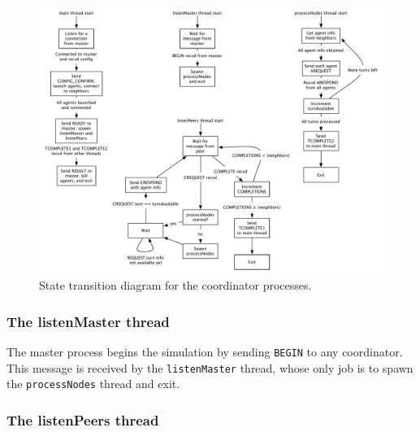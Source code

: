 \begin{figure}
    \begin{center}
        \includegraphics[scale=0.5]{figures/state_coord.pdf}
    \end{center}
    \caption{State transition diagram for the coordinator processes.}
    \label{coord}
\end{figure}

\subsubsection{The listenMaster thread}

The master process begins the simulation by sending \texttt{BEGIN} to any coordinator. This message is received by the \texttt{listenMaster} thread, whose only job is to spawn the \texttt{processNodes} thread and exit.

\subsubsection{The listenPeers thread}


